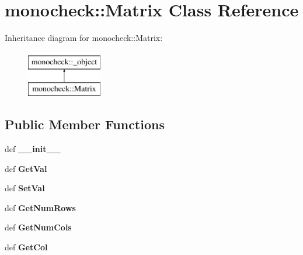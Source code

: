 \hypertarget{classmonocheck_1_1Matrix}{
\section{monocheck::Matrix Class Reference}
\label{d3/d15/classmonocheck_1_1Matrix}
}
Inheritance diagram for monocheck::Matrix:\begin{figure}[H]
\begin{center}
\leavevmode
\includegraphics[height=2cm]{d3/d15/classmonocheck_1_1Matrix}
\end{center}
\end{figure}
\subsection*{Public Member Functions}
\begin{DoxyCompactItemize}
\item 
\hypertarget{classmonocheck_1_1Matrix_a24536d0f43c78981935dd94967a121cf}{
def {\bfseries \_\-\_\-init\_\-\_\-}}
\label{d3/d15/classmonocheck_1_1Matrix_a24536d0f43c78981935dd94967a121cf}

\item 
\hypertarget{classmonocheck_1_1Matrix_aa3a58278b48efcfff8e5c491b7f86b44}{
def {\bfseries GetVal}}
\label{d3/d15/classmonocheck_1_1Matrix_aa3a58278b48efcfff8e5c491b7f86b44}

\item 
\hypertarget{classmonocheck_1_1Matrix_ac3c442daf925b657fe290c72dae1271c}{
def {\bfseries SetVal}}
\label{d3/d15/classmonocheck_1_1Matrix_ac3c442daf925b657fe290c72dae1271c}

\item 
\hypertarget{classmonocheck_1_1Matrix_abdb690f5b480564be56ff839f6cd79e7}{
def {\bfseries GetNumRows}}
\label{d3/d15/classmonocheck_1_1Matrix_abdb690f5b480564be56ff839f6cd79e7}

\item 
\hypertarget{classmonocheck_1_1Matrix_afe4ec68e3ecf301292b417cc2daf1db3}{
def {\bfseries GetNumCols}}
\label{d3/d15/classmonocheck_1_1Matrix_afe4ec68e3ecf301292b417cc2daf1db3}

\item 
\hypertarget{classmonocheck_1_1Matrix_af023859e735f04776b64d225d58ec5a5}{
def {\bfseries GetCol}}
\label{d3/d15/classmonocheck_1_1Matrix_af023859e735f04776b64d225d58ec5a5}

\end{DoxyCompactItemize}
